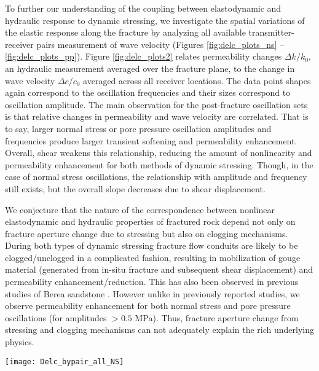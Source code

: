 \documentclass[draft]{agujournal2019}
\begin{document}
To further our understanding of the coupling between elastodynamic and hydraulic response to dynamic stressing, we investigate the spatial variations of the elastic response along the fracture by analyzing all available transmitter-receiver pairs measurement of wave velocity (Figures \ref{fig:delc_plots_ns} -- \ref{fig:delc_plots_pp}).
Figure \ref{fig:delc_plots2} relates permeability changes $ \Delta k/k_0 $, an hydraulic measurement averaged over the fracture plane, to the change in wave velocity $ \Delta c/c_0 $ averaged across all receiver locations. The data point shapes again correspond to the oscillation frequencies and their sizes correspond to oscillation amplitude. The main observation for the post-fracture oscillation sets is that relative changes in permeability and wave velocity are correlated. That is to say, larger normal stress or pore pressure oscillation amplitudes and frequencies produce larger transient softening and permeability enhancement. Overall, shear weakens this relationship, reducing the amount of nonlinearity and permeability enhancement for both methods of dynamic stressing. Though, in the case of normal stress oscillations, the relationship with amplitude and frequency still exists, but the overall slope decreases due to shear displacement.

We conjecture that the nature of the correspondence between nonlinear elastodynamic and hydraulic properties of fractured rock depend not only on fracture aperture change due to stressing but also on clogging mechanisms. During both types of dynamic stressing fracture flow conduits are likely to be clogged/unclogged in a complicated fashion, resulting in mobilization of gouge material (generated from in-situ fracture and subsequent shear displacement) and permeability enhancement/reduction. This has also been observed in previous studies of Berea sandstone \cite{Elkhoury11, Candela14, Candela15}. However unlike in previously reported studies, we observe permeability enhancement for both normal stress and pore pressure oscillations (for amplitudes $ > 0.5 $  MPa). Thus, fracture aperture change from stressing and clogging mechanisms can not adequately explain the rich underlying physics.

\begin{figure*}[ht]
	\centering
	\texttt{[image: Delc\_bypair\_all\_NS]}
	\caption{Nonlinearity as a function of $ \sigma_{NS} $ oscillation amplitude for each receiver. Transitioning from post-fracture results to post-shear results, we observe decreasing nonlinearity. The plot colors correspond to PZT receiver locations. These results demonstrate the spatial variability in nonlinear elasticity across the fracture plane and furthermore shows that the two Westerly granite samples exhibit similar responses to the normal stress oscillations.  }
	\label{fig:delc_plots_ns}
\end{figure*}
\end{document}
